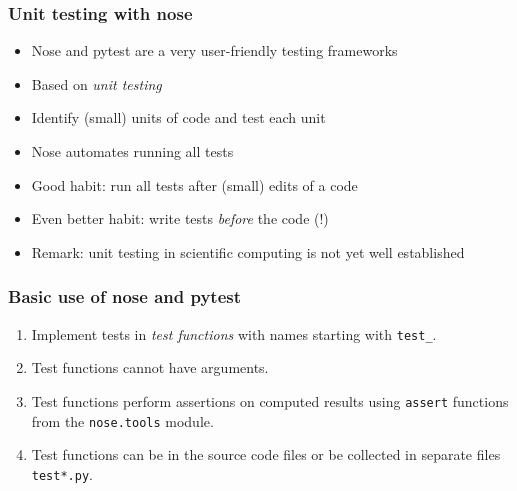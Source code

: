 \documentclass{beamer}
\begin{document}
\begin{frame}
\frametitle{Unit testing with nose}


\begin{itemize}
 \item Nose and pytest are a very user-friendly testing frameworks

 \item Based on \emph{unit testing}

 \item Identify (small) units of code and test each unit

 \item Nose automates running all tests

 \item Good habit: run all tests after (small) edits of a code

 \item Even better habit: write tests \emph{before} the code (!)

 \item Remark: unit testing in scientific computing is not yet well established
\end{itemize}

\noindent
\end{frame}

\begin{frame}
\frametitle{Basic use of nose and pytest}

\begin{enumerate}
 \item Implement tests in \emph{test functions} with names starting with \Verb!test_!.

 \item Test functions cannot have arguments.

 \item Test functions perform assertions on computed results
    using \texttt{assert} functions from the \texttt{nose.tools} module.

 \item Test functions can be in the source code files or be
    collected in separate files \texttt{test*.py}.
\end{enumerate}

\noindent
\end{frame}
\end{document}
